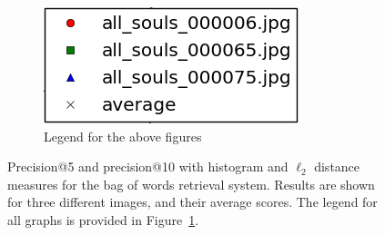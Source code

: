 \documentclass[a4paper,10pt,twoside]{article}
\begin{document}
\begin{figure}
\begin{center}
    \begin{subfigure}{0.47\textwidth}
      \centering
      \includegraphics[width=.5\textwidth]{precision_legend}
      \caption{Legend for the above figures}
      \label{fig:precision_legend}
    \end{subfigure}
  \end{center}
  \caption{Precision@5 and precision@10 with histogram and $\ell_2$ distance measures for the bag of words retrieval system.  Results are shown for three different images, and their average scores.  The legend for all graphs is provided in Figure~\ref{fig:precision_legend}.}
  \label{fig:precision}
\end{figure}
\end{document}
